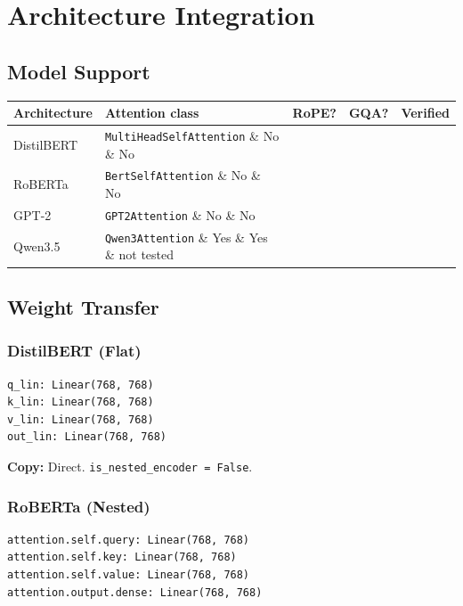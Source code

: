 
\section{Architecture Integration}

\subsection{Model Support}

\begin{table}[H]
\centering
\small
\begin{tabular}{lllll}
\toprule
\textbf{Architecture} & \textbf{Attention class} & \textbf{RoPE?} & \textbf{GQA?} & \textbf{Verified} \\
\midrule
DistilBERT & \texttt{MultiHeadSelfAttention} \& No \& No &  \\
RoBERTa & \texttt{BertSelfAttention} \& No \& No &  \\
GPT-2 & \texttt{GPT2Attention} \& No \& No &  \\
Qwen3.5 & \texttt{Qwen3Attention} \& Yes \& Yes \& not tested \\
\bottomrule
\end{tabular}
\end{table}

\subsection{Weight Transfer}

\subsubsection{DistilBERT (Flat)}

\begin{lstlisting}
q_lin: Linear(768, 768)
k_lin: Linear(768, 768)
v_lin: Linear(768, 768)
out_lin: Linear(768, 768)
\end{lstlisting}

\textbf{Copy:} Direct. \texttt{is\_nested\_encoder = False}.

\subsubsection{RoBERTa (Nested)}

\begin{lstlisting}
attention.self.query: Linear(768, 768)
attention.self.key: Linear(768, 768)
attention.self.value: Linear(768, 768)
attention.output.dense: Linear(768, 768)
\end{lstlisting}

